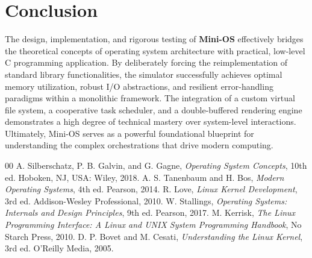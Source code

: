 \documentclass[conference]{IEEEtran}
\begin{document}
\section{Conclusion}
The design, implementation, and rigorous testing of \textbf{Mini-OS} effectively bridges the theoretical concepts of operating system architecture with practical, low-level C programming application. By deliberately forcing the reimplementation of standard library functionalities, the simulator successfully achieves optimal memory utilization, robust I/O abstractions, and resilient error-handling paradigms within a monolithic framework. The integration of a custom virtual file system, a cooperative task scheduler, and a double-buffered rendering engine demonstrates a high degree of technical mastery over system-level interactions. Ultimately, Mini-OS serves as a powerful foundational blueprint for understanding the complex orchestrations that drive modern computing.

\begin{thebibliography}{00}
A. Silberschatz, P. B. Galvin, and G. Gagne, \emph{Operating System Concepts}, 10th ed. Hoboken, NJ, USA: Wiley, 2018.
A. S. Tanenbaum and H. Bos, \emph{Modern Operating Systems}, 4th ed. Pearson, 2014.
R. Love, \emph{Linux Kernel Development}, 3rd ed. Addison-Wesley Professional, 2010.
W. Stallings, \emph{Operating Systems: Internals and Design Principles}, 9th ed. Pearson, 2017.
M. Kerrisk, \emph{The Linux Programming Interface: A Linux and UNIX System Programming Handbook}, No Starch Press, 2010.
D. P. Bovet and M. Cesati, \emph{Understanding the Linux Kernel}, 3rd ed. O'Reilly Media, 2005.
\end{thebibliography}
\end{document}
